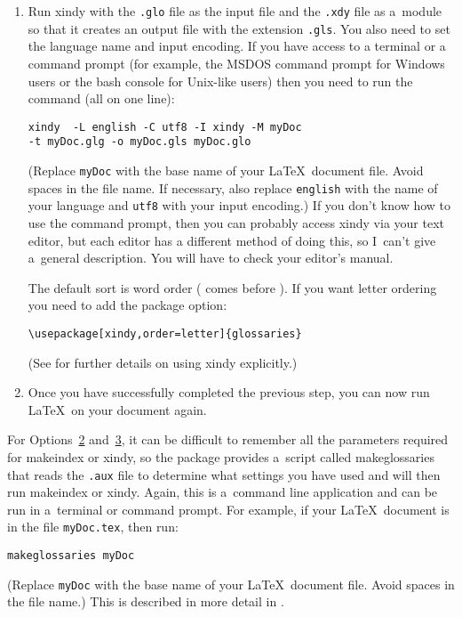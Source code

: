 \documentclass[report,inlinetitle]{nlctdoc}
\newcommand*{\optsand}[2]{Options~\hyperlink{option#1}{#1}
and~\hyperlink{option#2}{#2}}
\begin{document}
\begin{description}
\begin{enumerate}
    \item Run \gls{xindy} with the \texttt{.glo} file as the
    input file and the \texttt{.xdy} file as a~module so that
    it creates an output file with the extension \texttt{.gls}. You 
    also need to set the language name and input encoding. If
    you have access to a terminal or a command prompt (for example, the
    MSDOS command prompt for Windows users or the bash console for
    Unix-like users) then you need to run the command (all on one
    line):
\begin{verbatim}
xindy  -L english -C utf8 -I xindy -M myDoc 
-t myDoc.glg -o myDoc.gls myDoc.glo
\end{verbatim}
    (Replace \texttt{myDoc} with the base name of your \LaTeX\
    document file. Avoid spaces in the file name. If necessary, also replace
    \texttt{english} with the name of your language and \texttt{utf8}
    with your input encoding.) If you don't know
    how to use the command prompt, then you can probably access
    \gls{xindy} via your text editor, but each editor has a
    different method of doing this, so I~can't give a~general
    description. You will have to check your editor's manual.

    The default sort is word order ( comes before
). 
    If you want letter ordering you need to add the
     package option:
\begin{verbatim}
\usepackage[xindy,order=letter]{glossaries}
\end{verbatim}
    (See  for further details on using 
    \gls*{xindy} explicitly.)

    \item Once you have successfully completed the previous step,
    you can now run \LaTeX\ on your document again.

   \end{enumerate}

\end{description}

For \optsand23, it can be difficult to remember all the
parameters required for \gls{makeindex} or \gls{xindy}, so the
 package provides a~script called
\gls{makeglossaries} that reads the \texttt{.aux} file to
determine what settings you have used and will then run
\gls{makeindex} or \gls{xindy}. Again, this is a~command line
application and can be run in a~terminal or command prompt. For
example, if your \LaTeX\ document is in the file \texttt{myDoc.tex},
then run:
\begin{verbatim}
makeglossaries myDoc
\end{verbatim}
(Replace \texttt{myDoc} with the base name of your \LaTeX\ document
file. Avoid spaces in the file name.) This is described in more
detail in .
\end{document}
